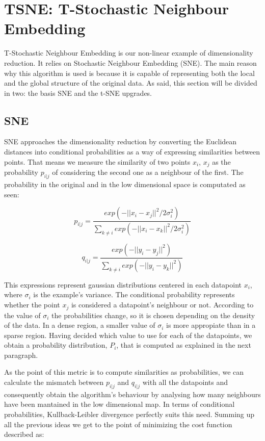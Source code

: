\documentclass[a4paper,11pt,spanish]{report}
\begin{document}
\section{TSNE: T-Stochastic Neighbour Embedding}
\label{sec:tsne}

T-Stochastic Neighbour Embedding \citep{tsne} is our non-linear example of dimensionality reduction. It relies on Stochastic Neighbour Embedding (SNE). The main reason why this algorithm is used is because it is capable of representing both the local and the global structure of the original data. As said, this section will be divided in two: the basis SNE and the t-SNE upgrades.

\subsection{SNE}
\label{ssec:sne}

SNE approaches the dimensionality reduction by converting the Euclidean distances into conditional probabilities as a way of expressing similarities between points. That means we measure the similarity of two points $x_{i}$, $x_{j}$ as the probability $p_{i|j}$ of considering the second one as a neighbour of the first. The probability in the original and in the low dimensional space is computated as seen:

$$ p_{i|j} = \frac{exp(-||x_{i}-x_{j}||^{2}/2\sigma_{i}^{2})}{\sum _{k\neq i} exp (-||x_{i}-x_{k}||^{2}/2\sigma_{i}^{2})}$$

$$ q_{i|j} = \frac{exp(-||y_{i}-y_{j}||^{2})}{\sum _{k\neq i} exp (-||y_{i}-y_{k}||^{2})} $$

This expressions represent gaussian distributions centered in each datapoint $x_{i}$, where $\sigma_{i}$ is the example's variance. The conditional probability represents whether the point $x_{j}$ is considered a datapoint's neighbour or not. According to the value of $\sigma_{i}$ the probabilities change, so it is chosen depending on the density of the data. In a dense region, a smaller value of $\sigma_{i}$ is more appropiate than in a sparse region. Having decided which value to use for each of the datapoints, we obtain a probability distribution, $P_{i}$, that is computed as explained in the next paragraph.

As the point of this metric is to compute similarities as probabilities, we can calculate the mismatch between $p_{i|j}$ and $q_{i|j}$ with all the datapoints and consequently obtain the algorithm's behaviour by analysing how many neighbours have been mantained in the low dimensional map. In terms of conditional probabilities, Kullback-Leibler divergence perfectly suits this need. Summing up all the previous ideas we get to the point of minimizing the cost function described as:
\end{document}
